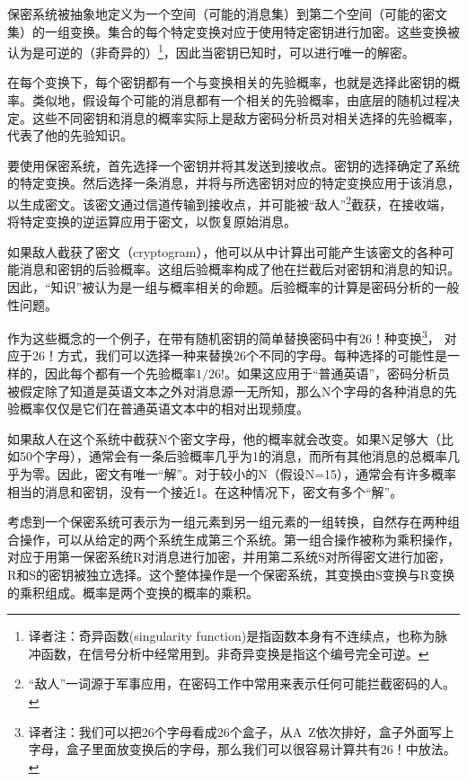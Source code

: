 \documentclass[]{article}
\begin{document}
保密系统被抽象地定义为一个空间（可能的消息集）到第二个空间（可能的密文集）的一组变换。集合的每个特定变换对应于使用特定密钥进行加密。这些变换被认为是可逆的（非奇异的）\footnote{译者注：奇异函数(singularity function)是指函数本身有不连续点，也称为脉冲函数，在信号分析中经常用到。非奇异变换是指这个编号完全可逆。}，因此当密钥已知时，可以进行唯一的解密。\par

在每个变换下，每个密钥都有一个与变换相关的先验概率，也就是选择此密钥的概率。类似地，假设每个可能的消息都有一个相关的先验概率，由底层的随机过程决定。这些不同密钥和消息的概率实际上是敌方密码分析员对相关选择的先验概率，代表了他的先验知识。\par

要使用保密系统，首先选择一个密钥并将其发送到接收点。密钥的选择确定了系统的特定变换。然后选择一条消息，并将与所选密钥对应的特定变换应用于该消息，以生成密文。该密文通过信道传输到接收点，并可能被“敌人”\footnote{“敌人”一词源于军事应用，在密码工作中常用来表示任何可能拦截密码的人。}截获，在接收端，将特定变换的逆运算应用于密文，以恢复原始消息。\par

如果敌人截获了密文（cryptogram），他可以从中计算出可能产生该密文的各种可能消息和密钥的后验概率。这组后验概率构成了他在拦截后对密钥和消息的知识。因此，“知识”被认为是一组与概率相关的命题。后验概率的计算是密码分析的一般性问题。
\par

作为这些概念的一个例子，在带有随机密钥的简单替换密码中有26！种变换\footnote{译者注：我们可以把26个字母看成26个盒子，从A~Z依次排好，盒子外面写上字母，盒子里面放变换后的字母，那么我们可以很容易计算共有26！中放法。}，
对应于26！方式，我们可以选择一种来替换26个不同的字母。每种选择的可能性是一样的，因此每个都有一个先验概率$1/26!$。如果这应用于“普通英语”，密码分析员被假定除了知道是英语文本之外对消息源一无所知，那么N个字母的各种消息的先验概率仅仅是它们在普通英语文本中的相对出现频度。\par

如果敌人在这个系统中截获N个密文字母，他的概率就会改变。如果N足够大（比如50个字母），通常会有一条后验概率几乎为1的消息，而所有其他消息的总概率几乎为零。因此，密文有唯一“解”。对于较小的N（假设N=15），通常会有许多概率相当的消息和密钥，没有一个接近1。在这种情况下，密文有多个“解”。\par

考虑到一个保密系统可表示为一组元素到另一组元素的一组转换，自然存在两种组合操作，可以从给定的两个系统生成第三个系统。第一组合操作被称为乘积操作，对应于用第一保密系统R对消息进行加密，并用第二系统S对所得密文进行加密，R和S的密钥被独立选择。这个整体操作是一个保密系统，其变换由S变换与R变换的乘积组成。概率是两个变换的概率的乘积。\par
\end{document}
